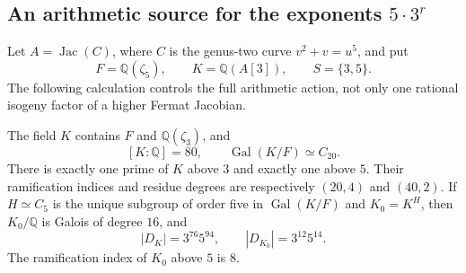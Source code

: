 \subsection{An arithmetic source for the exponents \texorpdfstring{$5\cdot3^r$}{5 times powers of three}}
\label{subsec:lm-fifteen-source}

Let $A=\operatorname{Jac}(C)$, where $C$ is the genus-two curve
$v^2+v=u^5$, and put
\[
 F=\mathbb Q(\zeta_5),\qquad K=\mathbb Q(A[3]),\qquad S=\{3,5\}.
\]
The following calculation controls the full arithmetic action, not only
one rational isogeny factor of a higher Fermat Jacobian.

\begin{proposition}
\label{prop:lm-a5-residual}
The field $K$ contains $F$ and $\mathbb Q(\zeta_3)$, and
\[
 [K:\mathbb Q]=80,\qquad
 \operatorname{Gal}(K/F)\simeq C_{20}.
\]
There is exactly one prime of $K$ above $3$ and exactly one above $5$.
Their ramification indices and residue degrees are respectively
$(20,4)$ and $(40,2)$.  If $H\simeq C_5$ is the unique subgroup of
order five in $\operatorname{Gal}(K/F)$ and $K_0=K^H$, then $K_0/\mathbb Q$
is Galois of degree $16$, and
\begin{equation}
 |D_K|=3^{76}5^{94},\qquad |D_{K_0}|=3^{12}5^{14}.
 \label{eq:lm-residual-discriminants}
\end{equation}
The ramification index of $K_0$ above $5$ is $8$.
\end{proposition}
